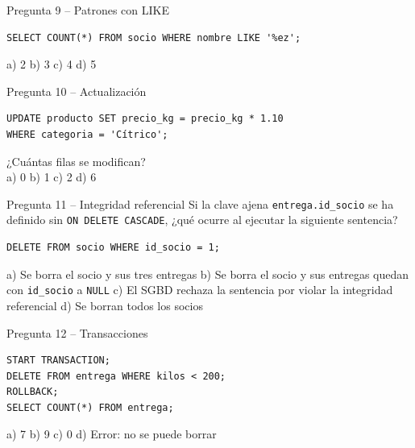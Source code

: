 \documentclass[11pt,a4paper]{article}
\begin{document}
\begin{reto}{Pregunta 9 -- Patrones con LIKE}
\begin{lstlisting}
SELECT COUNT(*) FROM socio WHERE nombre LIKE '%ez';
\end{lstlisting}
a) 2 \quad b) 3 \quad c) 4 \ok \quad d) 5
\end{reto}

\begin{reto}{Pregunta 10 -- Actualización}
\begin{lstlisting}
UPDATE producto SET precio_kg = precio_kg * 1.10
WHERE categoria = 'Cítrico';
\end{lstlisting}
¿Cuántas filas se modifican?\\
a) 0 \quad b) 1 \quad c) 2 \ok \quad d) 6
\end{reto}

\begin{reto}{Pregunta 11 -- Integridad referencial}
Si la clave ajena \texttt{entrega.id\_socio} se ha definido sin \texttt{ON DELETE CASCADE},
¿qué ocurre al ejecutar la siguiente sentencia?
\begin{lstlisting}
DELETE FROM socio WHERE id_socio = 1;
\end{lstlisting}
a) Se borra el socio y sus tres entregas \quad
b) Se borra el socio y sus entregas quedan con \texttt{id\_socio} a \texttt{NULL} \quad
c) El SGBD rechaza la sentencia por violar la integridad referencial \ok \quad
d) Se borran todos los socios
\end{reto}

\begin{reto}{Pregunta 12 -- Transacciones}
\begin{lstlisting}
START TRANSACTION;
DELETE FROM entrega WHERE kilos < 200;
ROLLBACK;
SELECT COUNT(*) FROM entrega;
\end{lstlisting}
a) 7 \quad b) 9 \ok \quad c) 0 \quad d) Error: no se puede borrar
\end{reto}
\end{document}
